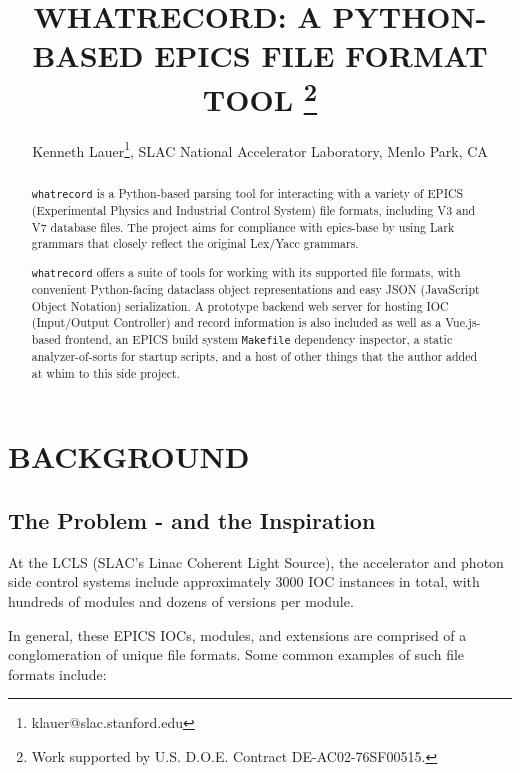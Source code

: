 \documentclass[letter,
               keeplastbox,   %
               ]{jacow}
\begin{document}
\title{WHATRECORD: A PYTHON-BASED EPICS FILE FORMAT TOOL
\thanks{Work supported by U.S. D.O.E. Contract DE-AC02-76SF00515.}}
\author{Kenneth Lauer\thanks{klauer@slac.stanford.edu}, SLAC National Accelerator Laboratory, Menlo Park, CA }
	
\maketitle

%
\begin{abstract}
  \verb_whatrecord_ is a Python-based parsing tool for
  interacting with a variety of EPICS (Experimental Physics and Industrial
  Control System) file formats, including V3 and V7 database files. The project
  aims for compliance with epics-base by using Lark grammars that
  closely reflect the original Lex/Yacc grammars. 

  \verb_whatrecord_ offers a suite of tools for working with its supported file
  formats, with convenient Python-facing dataclass object representations and
  easy JSON (JavaScript Object Notation) serialization. A prototype backend web
  server for hosting IOC (Input/Output Controller) and record information is
  also included as well as a Vue.js-based frontend, an EPICS build system
  \verb_Makefile_ dependency inspector, a static analyzer-of-sorts for startup
  scripts, and a host of other things that the author added at whim to this
  side project.
\end{abstract}

\section{BACKGROUND}

\subsection{The Problem - and the Inspiration}

At the LCLS (SLAC's Linac Coherent Light Source), the accelerator and photon
side control systems include approximately 3000 IOC instances in total, with
hundreds of modules and dozens of versions per module.

In general, these EPICS IOCs, modules, and extensions are comprised of a
conglomeration of unique file formats. Some common examples of such file
formats include:
\end{document}
